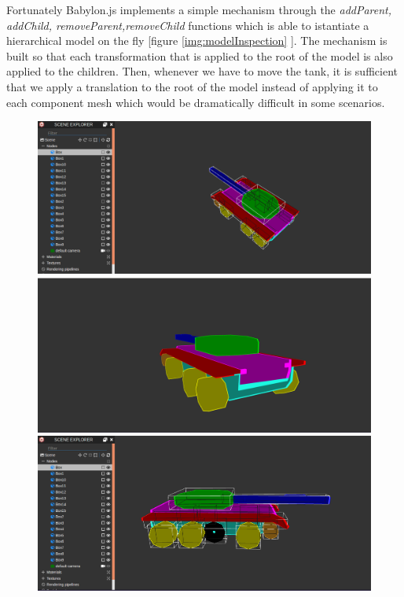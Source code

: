 \documentclass[14pt]{article}
\begin{document}
Fortunately Babylon.js implements a simple mechanism through the \textit{addParent, addChild, removeParent,removeChild} functions which is able to istantiate a hierarchical model on the fly [figure \ref{img:modelInspection} ]. The mechanism is built so that each transformation that is applied to the root of the model is also applied to the children. Then, whenever we have to move the tank, it is sufficient that we apply a translation to the root of the model instead of applying it to each component mesh which would be dramatically difficult in some scenarios.\\



\begin{figure}[H]
\begin{minipage}[t]{0.45\textwidth}
\center
\includegraphics[width=\textwidth]{images/evidencedModel2.png}
\end{minipage}
\hfill
\begin{minipage}[t]{0.45\textwidth}
\center
\includegraphics[width=\textwidth]{images/evidencedModel9.png}
\end{minipage}
\begin{minipage}[t]{0.45\textwidth}
\center
\includegraphics[width=\textwidth]{images/evidencedModel4.png}

\end{minipage}
\end{figure}
\end{document}
